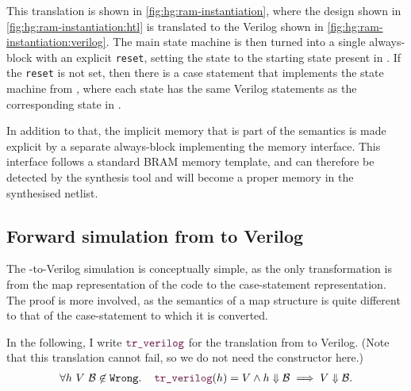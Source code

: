 This translation is shown in \cref{fig:hg:ram-instantiation}, where the \htl{}
design shown in \cref{fig:hg:ram-instantiation:htl} is translated to the Verilog
shown in \cref{fig:hg:ram-instantiation:verilog}.  The main state machine is
then turned into a single always-block with an explicit \texttt{reset}, setting
the state to the starting state present in \htl{}.  If the \texttt{reset} is not
set, then there is a case statement that implements the state machine from
\htl{}, where each state has the same Verilog statements as the corresponding
state in \htl{}.

In addition to that, the implicit memory that is part of the \htl{} semantics is
made explicit by a separate always-block implementing the memory interface.
This interface follows a standard \gls{BRAM} memory template, and can therefore
be detected by the synthesis tool and will become a proper memory in the
synthesised netlist.

\subsection{Forward simulation from \htl{} to Verilog}%
\label{sec:proof:htl_verilog}

The \htl{}-to-Verilog simulation is conceptually simple, as the only
transformation is from the map representation of the code to the case-statement
representation.  The proof is more involved, as the semantics of a map structure
is quite different to that of the case-statement to which it is converted.

\begin{lemma}\label{lemma:verilog}
  In the following, I write $\yhfunction{tr\_verilog}$ for the translation from
  \htl{} to Verilog. (Note that this translation cannot fail, so we do not need
  the  constructor here.)  {\normalfont
    \begin{align*}
      \forall h\ V\ \mathcal{B} \not\in \texttt{Wrong}\ldotp\quad \yhfunction{tr\_verilog} (h) = V \land h \Downarrow \mathcal{B} \implies V \Downarrow \mathcal{B}.
    \end{align*}}
\end{lemma}


